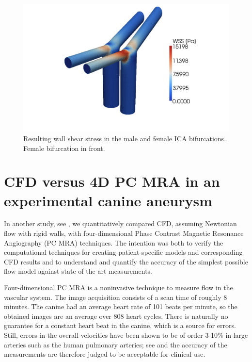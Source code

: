 \begin{figure}
  \center\includegraphics[width=\largefig]{chapters/kvs-2/pdf/icas_wss.pdf}
    \caption{Resulting wall shear stress in the male and female ICA
      bifurcations. Female bifurcation in front.}
    \label{fig:kvs-2:ica_wss_res}
\end{figure}

\section{CFD versus 4D PC MRA in an experimental canine aneurysm} \label{dog_study}

In another study, see \citet{JiangJohnsonValen-SendstadEtAl2010}, we
quantitatively compared CFD, assuming Newtonian flow with rigid walls,
with four-dimensional Phase Contrast Magnetic Resonance Angiography
(PC MRA) techniques. The intention was both to verify the
computational techniques for creating patient-specific models and
corresponding CFD results and to understand and quantify the accuracy
of the simplest possible flow model against state-of-the-art
measurements.

Four-dimensional PC MRA is a noninvasive technique to measure flow in
the vascular system. The image acquisition consists of a scan time of
roughly 8 minutes. The canine had an average heart rate of 101 beats
per minute, so the obtained images are an average over 808 heart
cycles. There is naturally no guarantee for a constant heart beat in
the canine, which is a source for errors. Still, errors in
the overall velocities have been shown to
be of order 3-10\% in large arteries such as the human pulmonary arteries;
see \citet{LotzMeierLeppertEtAl2002,EvansIwaiGristEtAl1993} and
the accuracy of the measurements are therefore judged to be acceptable
for clinical use.


